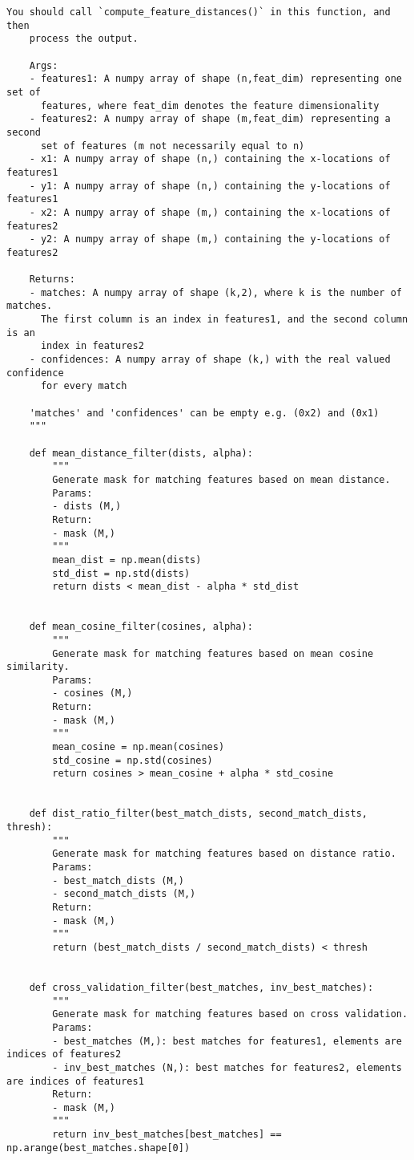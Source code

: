\begin{lstlisting}[style=Python]
    You should call `compute_feature_distances()` in this function, and then
    process the output.

    Args:
    - features1: A numpy array of shape (n,feat_dim) representing one set of
      features, where feat_dim denotes the feature dimensionality
    - features2: A numpy array of shape (m,feat_dim) representing a second
      set of features (m not necessarily equal to n)
    - x1: A numpy array of shape (n,) containing the x-locations of features1
    - y1: A numpy array of shape (n,) containing the y-locations of features1
    - x2: A numpy array of shape (m,) containing the x-locations of features2
    - y2: A numpy array of shape (m,) containing the y-locations of features2

    Returns:
    - matches: A numpy array of shape (k,2), where k is the number of matches.
      The first column is an index in features1, and the second column is an
      index in features2
    - confidences: A numpy array of shape (k,) with the real valued confidence
      for every match

    'matches' and 'confidences' can be empty e.g. (0x2) and (0x1)
    """
    
    def mean_distance_filter(dists, alpha):
        """
        Generate mask for matching features based on mean distance.
        Params:
        - dists (M,)
        Return:
        - mask (M,)
        """
        mean_dist = np.mean(dists)
        std_dist = np.std(dists)
        return dists < mean_dist - alpha * std_dist
    
    
    def mean_cosine_filter(cosines, alpha):
        """
        Generate mask for matching features based on mean cosine similarity.
        Params:
        - cosines (M,)
        Return:
        - mask (M,)
        """
        mean_cosine = np.mean(cosines)
        std_cosine = np.std(cosines)
        return cosines > mean_cosine + alpha * std_cosine
    
    
    def dist_ratio_filter(best_match_dists, second_match_dists, thresh):
        """
        Generate mask for matching features based on distance ratio.
        Params:
        - best_match_dists (M,)
        - second_match_dists (M,)
        Return:
        - mask (M,)
        """
        return (best_match_dists / second_match_dists) < thresh
    
    
    def cross_validation_filter(best_matches, inv_best_matches):
        """
        Generate mask for matching features based on cross validation.
        Params:
        - best_matches (M,): best matches for features1, elements are indices of features2
        - inv_best_matches (N,): best matches for features2, elements are indices of features1
        Return:
        - mask (M,)
        """
        return inv_best_matches[best_matches] == np.arange(best_matches.shape[0])
    

\end{lstlisting}
